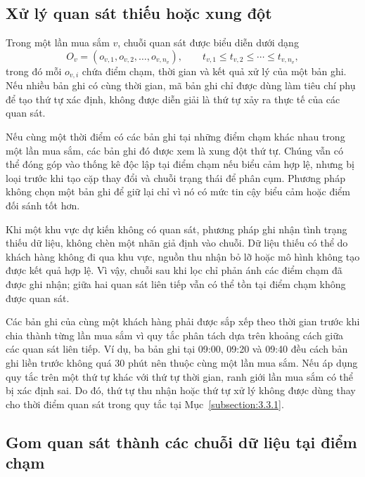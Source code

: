 \documentclass[../LuanVan.tex]{subfiles}
\begin{document}
\subsection{Xử lý quan sát thiếu hoặc xung đột}
\label{subsection:3.3.2}

Trong một lần mua sắm $v$, chuỗi quan sát được biểu diễn dưới dạng
\begin{equation}
    O_v=(o_{v,1},o_{v,2},\ldots,o_{v,n_v}),
    \qquad t_{v,1}\leq t_{v,2}\leq\cdots\leq t_{v,n_v},
    \label{eq:ch3_observation_sequence}
\end{equation}
trong đó mỗi $o_{v,i}$ chứa điểm chạm, thời gian và kết quả xử lý của một bản ghi. Nếu nhiều bản ghi có cùng thời gian, mã bản ghi chỉ được dùng làm tiêu chí phụ để tạo thứ tự xác định, không được diễn giải là thứ tự xảy ra thực tế của các quan sát.

Nếu cùng một thời điểm có các bản ghi tại những điểm chạm khác nhau trong một lần mua sắm, các bản ghi đó được xem là xung đột thứ tự. Chúng vẫn có thể đóng góp vào thống kê độc lập tại điểm chạm nếu biểu cảm hợp lệ, nhưng bị loại trước khi tạo cặp thay đổi và chuỗi trạng thái để phân cụm. Phương pháp không chọn một bản ghi để giữ lại chỉ vì nó có mức tin cậy biểu cảm hoặc điểm đối sánh tốt hơn.

Khi một khu vực dự kiến không có quan sát, phương pháp ghi nhận tình trạng thiếu dữ liệu, không chèn một nhãn giả định vào chuỗi. Dữ liệu thiếu có thể do khách hàng không đi qua khu vực, nguồn thu nhận bỏ lỡ hoặc mô hình không tạo được kết quả hợp lệ. Vì vậy, chuỗi sau khi lọc chỉ phản ánh các điểm chạm đã được ghi nhận; giữa hai quan sát liên tiếp vẫn có thể tồn tại điểm chạm không được quan sát.

Các bản ghi của cùng một khách hàng phải được sắp xếp theo thời gian trước khi chia thành từng lần mua sắm vì quy tắc phân tách dựa trên khoảng cách giữa các quan sát liên tiếp. Ví dụ, ba bản ghi tại 09:00, 09:20 và 09:40 đều cách bản ghi liền trước không quá 30 phút nên thuộc cùng một lần mua sắm. Nếu áp dụng quy tắc trên một thứ tự khác với thứ tự thời gian, ranh giới lần mua sắm có thể bị xác định sai. Do đó, thứ tự thu nhận hoặc thứ tự xử lý không được dùng thay cho thời điểm quan sát trong quy tắc tại Mục~\ref{subsection:3.3.1}.

\subsection{Gom quan sát thành các chuỗi dữ liệu tại điểm chạm}
\label{subsection:3.3.3}
\end{document}
